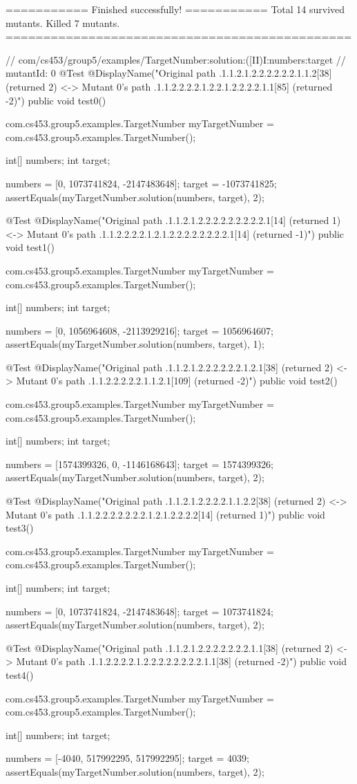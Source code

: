
=========== Finished successfully! ===========
Total 14 survived mutants. Killed 7 mutants.
==============================================

// com/cs453/group5/examples/TargetNumber:solution:([II)I:numbers:target
// mutantId: 0
@Test
@DisplayName("Original path .1.1.2.1.2.2.2.2.2.2.1.1.2[38] (returned 2) <-> Mutant 0's path .1.1.2.2.2.2.1.2.2.1.2.2.2.2.1.1[85] (returned -2)")
public void test0() {
    com.cs453.group5.examples.TargetNumber myTargetNumber = com.cs453.group5.examples.TargetNumber();

    int[] numbers;
    int target;

    numbers = [0, 1073741824, -2147483648];
    target = -1073741825;
    assertEquals(myTargetNumber.solution(numbers, target), 2);
}

@Test
@DisplayName("Original path .1.1.2.1.2.2.2.2.2.2.2.2.2.1[14] (returned 1) <-> Mutant 0's path .1.1.2.2.2.2.1.2.1.2.2.2.2.2.2.2.2.1[14] (returned -1)")
public void test1() {
    com.cs453.group5.examples.TargetNumber myTargetNumber = com.cs453.group5.examples.TargetNumber();

    int[] numbers;
    int target;

    numbers = [0, 1056964608, -2113929216];
    target = 1056964607;
    assertEquals(myTargetNumber.solution(numbers, target), 1);
}

@Test
@DisplayName("Original path .1.1.2.1.2.2.2.2.2.2.1.2.1[38] (returned 2) <-> Mutant 0's path .1.1.2.2.2.2.2.1.1.2.1[109] (returned -2)")
public void test2() {
    com.cs453.group5.examples.TargetNumber myTargetNumber = com.cs453.group5.examples.TargetNumber();

    int[] numbers;
    int target;

    numbers = [1574399326, 0, -1146168643];
    target = 1574399326;
    assertEquals(myTargetNumber.solution(numbers, target), 2);
}

@Test
@DisplayName("Original path .1.1.2.1.2.2.2.2.1.1.2.2[38] (returned 2) <-> Mutant 0's path .1.1.2.2.2.2.2.2.2.1.2.1.2.2.2.2[14] (returned 1)")
public void test3() {
    com.cs453.group5.examples.TargetNumber myTargetNumber = com.cs453.group5.examples.TargetNumber();

    int[] numbers;
    int target;

    numbers = [0, 1073741824, -2147483648];
    target = 1073741824;
    assertEquals(myTargetNumber.solution(numbers, target), 2);
}

@Test
@DisplayName("Original path .1.1.2.1.2.2.2.2.2.2.2.1.1[38] (returned 2) <-> Mutant 0's path .1.1.2.2.2.2.1.2.2.2.2.2.2.2.2.1.1[38] (returned -2)")
public void test4() {
    com.cs453.group5.examples.TargetNumber myTargetNumber = com.cs453.group5.examples.TargetNumber();

    int[] numbers;
    int target;

    numbers = [-4040, 517992295, 517992295];
    target = 4039;
    assertEquals(myTargetNumber.solution(numbers, target), 2);
}

